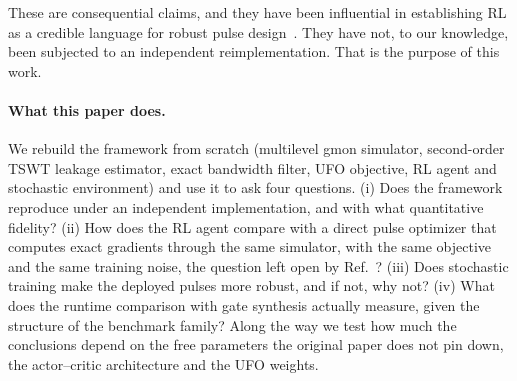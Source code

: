 \documentclass[aps,prx,twocolumn,superscriptaddress,nofootinbib,amsmath,amssymb,floatfix]{revtex4-2}
\begin{document}
These are consequential claims, and they have been influential in establishing RL as a credible
language for robust pulse design~\cite{Bukov2018,Sivak2022,Khalid2023}. They have not, to our
knowledge, been subjected to an independent reimplementation. That is the purpose of this work.

\paragraph*{What this paper does.}
We rebuild the framework from scratch (multilevel gmon simulator, second-order TSWT leakage
estimator, exact bandwidth filter, UFO objective, RL agent and stochastic environment) and use it
to ask four questions. (i) Does the framework reproduce under an independent implementation, and with
what quantitative fidelity? (ii) How does the RL agent compare with a direct pulse
optimizer that computes exact gradients through the same simulator, with the same objective and the
same training noise, the question left open by Ref.~\cite{Niu2019}? (iii) Does stochastic training make
the deployed pulses more robust, and if not, why not? (iv) What does the runtime comparison with gate
synthesis actually measure, given the structure of the benchmark family? Along the way we test how
much the conclusions depend on the free parameters the original paper does not pin down, the
actor--critic architecture and the UFO weights.
\end{document}
